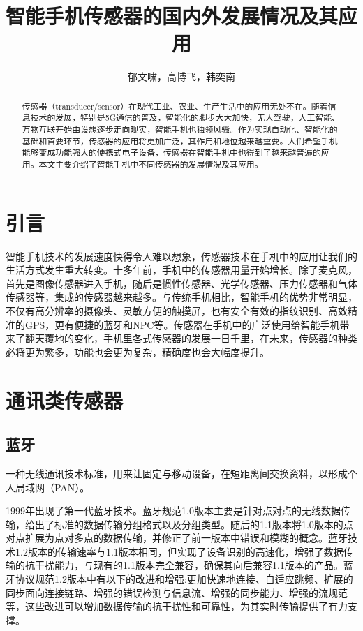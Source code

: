 \documentclass[lang=cn]{elegantpaper}
\title{智能手机传感器的国内外发展情况及其应用}
\author{郁文啸，高博飞，韩奕南}
\institute{(北京邮电大学计算机学院)}
\date{\zhtoday}
\begin{document}
\maketitle

\begin{abstract}
传感器（transducer/sensor）在现代工业、农业、生产生活中的应用无处不在。随着信息技术的发展，特别是5G通信的普及，智能化的脚步大大加快，无人驾驶，人工智能、万物互联开始由设想逐步走向现实，智能手机也独领风骚。作为实现自动化、智能化的基础和首要环节，传感器的应用将更加广泛，其作用和地位越来越重要。人们希望手机能够变成功能强大的便携式电子设备，传感器在智能手机中也得到了越来越普遍的应用。本文主要介绍了智能手机中不同传感器的发展情况及其应用。
\end{abstract}

\section{引言}

智能手机技术的发展速度快得令人难以想象，传感器技术在手机中的应用让我们的生活方式发生重大转变。十多年前，手机中的传感器用量开始增长。除了麦克风，首先是图像传感器进入手机，随后是惯性传感器、光学传感器、压力传感器和气体传感器等，集成的传感器越来越多。与传统手机相比，智能手机的优势非常明显，不仅有高分辨率的摄像头、灵敏方便的触摸屏，也有安全有效的指纹识别、高效精准的GPS，更有便捷的蓝牙和NPC等。传感器在手机中的广泛使用给智能手机带来了翻天覆地的变化，手机里各式传感器的发展一日千里，在未来，传感器的种类必将更为繁多，功能也会更为复杂，精确度也会大幅度提升。


\section{通讯类传感器}

\subsection{蓝牙}

一种无线通讯技术标准，用来让固定与移动设备，在短距离间交换资料，以形成个人局域网（PAN）。

1999年出现了第一代蓝牙技术。蓝牙规范1.0版本主要是针对点对点的无线数据传输，给出了标准的数据传输分组格式以及分组类型。随后的1.1版本将1.0版本的点对点扩展为点对多点的数据传输，并修正了前一版本中错误和模糊的概念。蓝牙技术1.2版本的传输速率与1.1版本相同，但实现了设备识别的高速化，增强了数据传输的抗干扰能力，与现有的1.1版本完全兼容，确保其向后兼容1.1版本的产品。蓝牙协议规范1.2版本中有以下的改进和增强:更加快速地连接、自适应跳频、扩展的同步面向连接链路、增强的错误检测与信息流、增强的同步能力、增强的流规范等，这些改进可以增加数据传输的抗干扰性和可靠性，为其实时传输提供了有力支撑。
\end{document}
